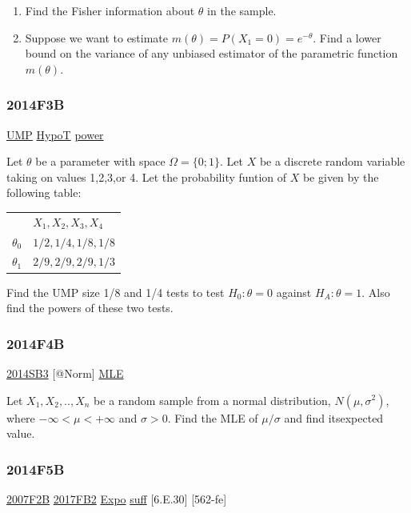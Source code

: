 \documentclass[10pt,twocolumn,portrait]{article}
\begin{document}
\begin{enumerate}
\def\labelenumi{(\alph{enumi})}
\item
  Find the Fisher information about \(\theta\) in the sample.
\item
  Suppose we want to estimate \(m(\theta)=P(X_1=0)=e^{-\theta}\). Find a
  lower bound on the variance of any unbiased estimator of the
  parametric function \(m(\theta)\).
\end{enumerate}

\hypertarget{f3b-1}{%
\subsubsection{2014F3B}\label{f3b-1}}

\protect\hyperlink{section-7}{UMP} \protect\hyperlink{HypoT}{HypoT}
\protect\hyperlink{power}{power}

Let \(\theta\) be a parameter with space \(\Omega=\{0; 1\}\). Let \(X\)
be a discrete random variable taking on values 1,2,3,or 4. Let the
probability funtion of \(X\) be given by the following table:

\begin{tabular}{l|l}
&$X_1,X_2,X_3,X_4$\\
$\theta_0$&$1/2,1/4,1/8,1/8$\\
$\theta_1$&$2/9,2/9,2/9,1/3$\\
\end{tabular}

Find the UMP size 1/8 and 1/4 tests to test \(H_0:\theta=0\) against
\(H_A:\theta=1\). Also find the powers of these two tests.

\hypertarget{f4b-1}{%
\subsubsection{2014F4B}\label{f4b-1}}

\protect\hyperlink{sb3-2}{2014SB3} {[}@Norm{]}
\protect\hyperlink{MLE}{MLE}

Let \(X_1,X_2,..,X_{n}\) be a random sample from a normal distribution,
\(N(\mu,\sigma^2)\), where \(-\infty<\mu<+\infty\) and \(\sigma>0\).
Find the MLE of \(\mu/\sigma\) and find itsexpected value.

\hypertarget{f5b-1}{%
\subsubsection{2014F5B}\label{f5b-1}}

\protect\hyperlink{f2b}{2007F2B} \protect\hyperlink{fb2-3}{2017FB2}
\protect\hyperlink{Expo}{Expo} \protect\hyperlink{section-6}{suff}
{[}6.E.30{]} {[}562-fe{]}
\end{document}
